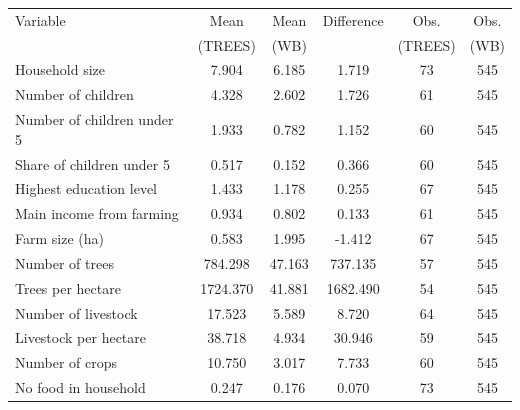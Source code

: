 \begin{tabular}{lccccc}
\hline
Variable & Mean  & Mean & Difference & Obs. & Obs. \\
& (TREES) & (WB) & & (TREES) & (WB) \\
\hline
Household size & 7.904 & 6.185 & 1.719 & 73 & 545 \\
Number of children & 4.328 & 2.602 & 1.726 & 61 & 545 \\
Number of children under 5 & 1.933 & 0.782 & 1.152 & 60 & 545 \\
Share of children under 5 & 0.517 & 0.152 & 0.366 & 60 & 545 \\
Highest education level & 1.433 & 1.178 & 0.255 & 67 & 545 \\
Main income from farming & 0.934 & 0.802 & 0.133 & 61 & 545 \\
Farm size (ha) & 0.583 & 1.995 & -1.412 & 67 & 545 \\
Number of trees & 784.298 & 47.163 & 737.135 & 57 & 545 \\
Trees per hectare & 1724.370 & 41.881 & 1682.490 & 54 & 545 \\
Number of livestock & 17.523 & 5.589 & 8.720 & 64 & 545 \\
Livestock per hectare & 38.718 & 4.934 & 30.946 & 59 & 545 \\
Number of crops & 10.750 & 3.017 & 7.733 & 60 & 545 \\
No food in household & 0.247 & 0.176 & 0.070 & 73 & 545 \\
\hline
\end{tabular}
